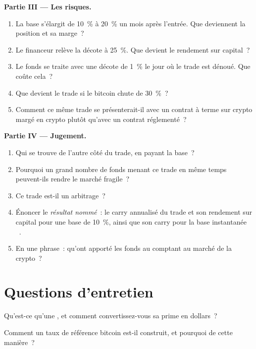 \begin{problem}
\medskip\noindent\textbf{Partie III --- Les risques.}
\begin{enumerate}[resume]
\item La base s'élargit de 10~\% à 20~\% un mois après l'entrée. Que deviennent la position et sa marge~?
\item Le financeur relève la décote à 25~\%. Que devient le rendement sur capital~?
\item Le fonds se traite avec une décote de 1~\% le jour où le trade est dénoué. Que coûte cela~?
\item Que devient le trade si le bitcoin chute de 30~\%~?
\item Comment ce même trade se présenterait-il avec un contrat à terme sur crypto margé en crypto plutôt qu'avec un contrat réglementé~?
\end{enumerate}

\medskip\noindent\textbf{Partie IV --- Jugement.}
\begin{enumerate}[resume]
\item Qui se trouve de l'autre côté du trade, en payant la base~?
\item Pourquoi un grand nombre de fonds menant ce trade en même temps peuvent-ils rendre le marché fragile~?
\item Ce trade est-il un arbitrage~?
\item Énoncer le \emph{résultat nommé}~: le carry annualisé du trade et son rendement sur capital pour une base de 10~\%, ainsi que son carry pour la base instantanée
~.
\item En une phrase~: qu'ont apporté les fonds au comptant au marché de la crypto~?
\end{enumerate}
\end{problem}

\section{Questions d'entretien}

\begin{interviewq}\label{iq:m3:dated-futures-options-and-etfs:1}
Qu'est-ce qu'une , et comment convertissez-vous sa prime en dollars~?
\end{interviewq}

\begin{interviewq}\label{iq:m3:dated-futures-options-and-etfs:2}
Comment un taux de référence bitcoin est-il construit, et pourquoi de cette manière~?
\end{interviewq}

